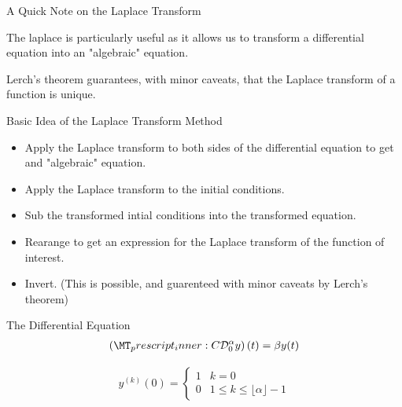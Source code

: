 \documentclass[pdf]{beamer}
\begin{document}
\begin{frame}{A Quick Note on the Laplace Transform}
	
		
	
	The laplace is particularly useful as it allows us to transform a differential equation into
	an "algebraic" equation. 
	
	Lerch's theorem guarantees, with minor caveats, that the Laplace transform of a function is
	unique.
	
\end{frame}

\begin{frame}{Basic Idea of the Laplace Transform Method}
	\begin{itemize}
		\item Apply the Laplace transform to both sides of the differential equation to get
		and "algebraic" equation.
		\item Apply the Laplace transform to the initial conditions. 
		\item Sub the transformed intial conditions into the transformed equation.
		\item Rearange to get an expression for the Laplace transform of the function of interest.
		\item Invert. (This is possible, and guarenteed with minor caveats by Lerch's theorem)
	\end{itemize}
\end{frame}

\begin{frame}{The Differential Equation}
	\begin{align*}
		\left( \prescript{C}{}{\mathcal{D}_0^\alpha}y \right)(t) = \beta y(t) 
	\end{align*}
	
	\begin{align*}
		y^{(k)}(0) = 
		\begin{cases}
			1 & k = 0 \\
			0 & 1 \leq k \leq \lfloor \alpha \rfloor - 1  
		\end{cases}
	\end{align*}
\end{frame}

	
\end{document}

